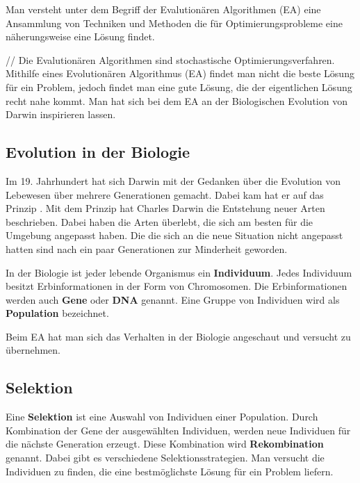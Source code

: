 
Man versteht unter dem Begriff der Evalution{\"a}ren Algorithmen (EA) eine Ansammlung von Techniken und Methoden die f{\"u}r Optimierungsprobleme eine n{\"a}herungsweise eine L{\"o}sung findet. \cite{weicker2015evolutionare} 

// Die Evalution{\"a}ren Algorithmen sind stochastische Optimierungsverfahren. Mithilfe eines Evolution{\"a}ren Algorithmus (EA) findet man nicht die beste L{\"o}sung f{\"u}r ein Problem, jedoch findet man eine gute L{\"o}sung, die der eigentlichen L{\"o}sung recht nahe kommt.
Man hat sich bei dem EA an der Biologischen Evolution von Darwin inspirieren lassen. \cite{selzam2003genetische}

\subsection{Evolution in der Biologie}
Im 19. Jahrhundert hat sich Darwin mit der Gedanken {\"u}ber die Evolution von Lebewesen {\"u}ber mehrere Generationen gemacht. Dabei kam hat er auf das Prinzip . Mit dem Prinzip hat Charles Darwin die Entstehung neuer Arten beschrieben. Dabei haben die Arten {\"u}berlebt, die sich am besten f{\"u}r die Umgebung angepasst haben. Die die sich an die neue Situation nicht angepasst hatten sind nach ein paar Generationen zur Minderheit geworden. \cite{hunermann2007brockhaus}

In der Biologie ist jeder lebende Organismus ein \textbf{Individuum}.
Jedes Individuum besitzt Erbinformationen in der Form von Chromosomen. Die Erbinformationen werden auch \textbf{Gene} oder \textbf{DNA} genannt. 
Eine Gruppe von Individuen wird als \textbf{Population} bezeichnet. 

Beim EA hat man sich das Verhalten in der Biologie angeschaut und versucht zu {\"u}bernehmen. \cite{flickevolutionare}


\subsection{Selektion}

Eine \textbf{Selektion} ist eine Auswahl von Individuen einer Population. Durch Kombination der Gene der ausgew{\"a}hlten Individuen, werden neue Individuen f{\"u}r die n{\"a}chste Generation erzeugt. Diese Kombination wird \textbf{Rekombination} genannt.
Dabei gibt es verschiedene Selektionsstrategien. Man versucht die Individuen zu finden, die eine bestm{\"o}glichste L{\"o}sung f{\"u}r ein Problem liefern. \cite{weicker2015evolutionare} \cite{flickevolutionare}

